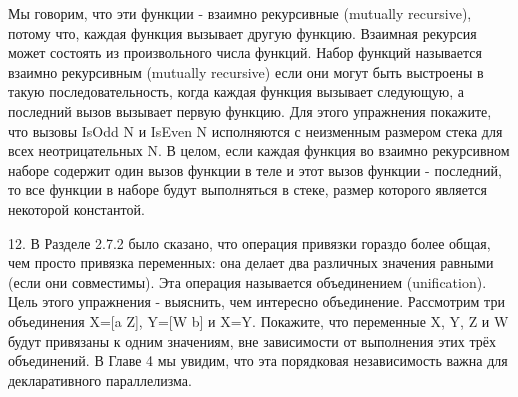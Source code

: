 Мы говорим, что эти функции - взаимно рекурсивные (mutually recursive), потому что, каждая функция вызывает другую функцию. Взаимная рекурсия может состоять из произвольного числа функций. Набор функций называется взаимно рекурсивным (mutually recursive) если они могут быть выстроены в такую последовательность, когда каждая функция вызывает следующую, а последний вызов вызывает первую функцию. Для этого упражнения покажите, что вызовы {IsOdd N} и {IsEven N} исполняются с неизменным размером стека для всех неотрицательных N. В целом, если каждая функция во взаимно рекурсивном наборе содержит один вызов функции в теле и этот вызов функции - последний, то все функции в наборе будут выполняться в стеке, размер которого является некоторой константой.

12. В Разделе 2.7.2 было сказано, что операция привязки гораздо более общая, чем просто привязка переменных: она делает два различных значения равными (если они совместимы). Эта операция называется объединением (unification). Цель этого упражнения - выяснить, чем интересно объединение. Рассмотрим три объединения X=[a Z], Y=[W b] и X=Y. Покажите, что переменные X, Y, Z и W будут привязаны к одним значениям, вне зависимости от выполнения этих трёх объединений. В Главе 4 мы увидим, что эта порядковая независимость важна для декларативного параллелизма.
